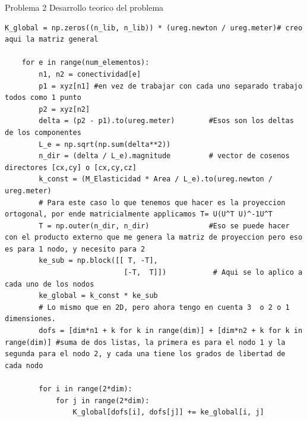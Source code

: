\begin{desarrollo}{Problema 2 Desarrollo teorico del problema}
\begin{lstlisting}[style=pythonstyle, caption={Ensamblaje de la matriz de rigidez global}, label={lst:gen_matriz_global}]
    K_global = np.zeros((n_lib, n_lib)) * (ureg.newton / ureg.meter)# creo aqui la matriz general

    for e in range(num_elementos):
        n1, n2 = conectividad[e]
        p1 = xyz[n1] #en vez de trabajar con cada uno separado trabajo todos como 1 punto
        p2 = xyz[n2]
        delta = (p2 - p1).to(ureg.meter)        #Esos son los deltas de los componentes
        L_e = np.sqrt(np.sum(delta**2))
        n_dir = (delta / L_e).magnitude         # vector de cosenos directores [cx,cy] o [cx,cy,cz]
        k_const = (M_Elasticidad * Area / L_e).to(ureg.newton / ureg.meter)
        # Para este caso lo que tenemos que hacer es la proyeccion ortogonal, por ende matricialmente applicamos T= U(U^T U)^-1U^T
        T = np.outer(n_dir, n_dir)              #Eso se puede hacer con el producto externo que me genera la matriz de proyeccion pero eso es para 1 nodo, y necesito para 2
        ke_sub = np.block([[ T, -T],
                            [-T,  T]])           # Aqui se lo aplico a cada uno de los nodos
        ke_global = k_const * ke_sub
        # Lo mismo que en 2D, pero ahora tengo en cuenta 3  o 2 o 1 dimensiones.
        dofs = [dim*n1 + k for k in range(dim)] + [dim*n2 + k for k in range(dim)] #suma de dos listas, la primera es para el nodo 1 y la segunda para el nodo 2, y cada una tiene los grados de libertad de cada nodo

        for i in range(2*dim):
            for j in range(2*dim):
                K_global[dofs[i], dofs[j]] += ke_global[i, j]


\end{lstlisting}
\end{desarrollo}
